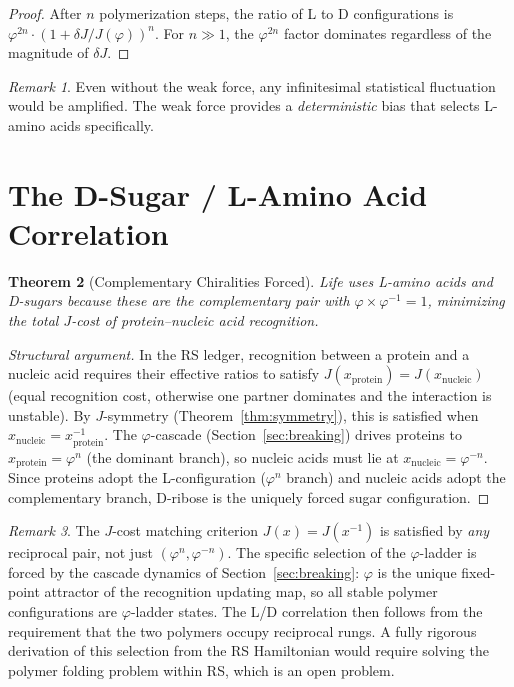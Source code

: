\documentclass[12pt,a4paper]{article}
\newtheorem{theorem}{Theorem}[section]
\theoremstyle{definition}
\theoremstyle{remark}
\newtheorem{remark}[theorem]{Remark}
\begin{document}
\begin{proof}
After $n$ polymerization steps, the ratio of L to D configurations is
$\varphi^{2n} \cdot (1 + \delta J / J(\varphi))^n$.  For $n \gg 1$,
the $\varphi^{2n}$ factor dominates regardless of the magnitude of
$\delta J$.
\end{proof}

\begin{remark}
Even without the weak force, any infinitesimal statistical
fluctuation would be amplified.  The weak force provides a
\emph{deterministic} bias that selects L-amino acids specifically.
\end{remark}

\section{The D-Sugar / L-Amino Acid Correlation}
\label{sec:correlation}

\begin{theorem}[Complementary Chiralities Forced]
\label{thm:complement}
Life uses L-amino acids and D-sugars because these are the
complementary pair with $\varphi \times \varphi^{-1} = 1$, minimizing
the total $J$-cost of protein--nucleic acid recognition.
\end{theorem}

\begin{proof}[Structural argument]
In the RS ledger, recognition between a protein and a nucleic acid
requires their effective ratios to satisfy $J(x_{\mathrm{protein}}) =
J(x_{\mathrm{nucleic}})$ (equal recognition cost, otherwise one partner
dominates and the interaction is unstable).  By $J$-symmetry
(Theorem~\ref{thm:symmetry}), this is satisfied when
$x_{\mathrm{nucleic}} = x_{\mathrm{protein}}^{-1}$.  The
$\varphi$-cascade (Section~\ref{sec:breaking}) drives proteins to
$x_{\mathrm{protein}} = \varphi^n$ (the dominant branch), so nucleic
acids must lie at $x_{\mathrm{nucleic}} = \varphi^{-n}$.  Since proteins
adopt the L-configuration ($\varphi^n$ branch) and nucleic acids adopt
the complementary branch, D-ribose is the uniquely forced sugar
configuration.
\end{proof}

\begin{remark}
The $J$-cost matching criterion $J(x) = J(x^{-1})$ is satisfied by
\emph{any} reciprocal pair, not just $(\varphi^n, \varphi^{-n})$.  The
specific selection of the $\varphi$-ladder is forced by the cascade
dynamics of Section~\ref{sec:breaking}: $\varphi$ is the unique
fixed-point attractor of the recognition updating map, so all stable
polymer configurations are $\varphi$-ladder states.  The L/D
correlation then follows from the requirement that the two polymers
occupy reciprocal rungs.  A fully rigorous derivation of this
  selection from the RS Hamiltonian would require solving the polymer
  folding problem within RS, which is an open problem.
\end{remark}
\end{document}
